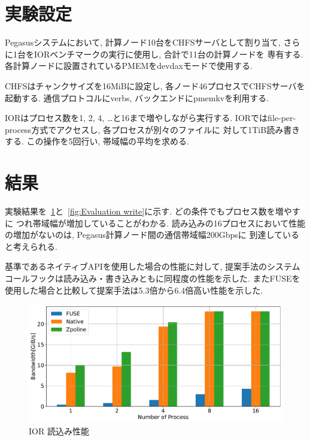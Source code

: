 \documentclass[a4paper,11pt]{jreport}
\begin{document}
\section{実験設定}
Pegasusシステムにおいて, 計算ノード10台をCHFSサーバとして割り当て, さらに1台をIORベンチマークの実行に使用し, 合計で11台の計算ノードを
専有する. 各計算ノードに設置されているPMEMをdevdaxモードで使用する. 

CHFSはチャンクサイズを16MiBに設定し, 各ノード46プロセスでCHFSサーバを起動する. 通信プロトコルにverbs, バックエンドにpmemkvを利用する. 

IORはプロセス数を1, 2, 4, …と16まで増やしながら実行する. IORではfile-per-process方式でアクセスし, 各プロセスが別々のファイルに
対して1TiB読み書きする. この操作を5回行い, 帯域幅の平均を求める. 
\section{結果}

実験結果を\figurename~\ref{fig:Evaluation read}と\figurename~\ref{fig:Evaluation write}に示す. どの条件でもプロセス数を増やすに
つれ帯域幅が増加していることがわかる. 読み込みの16プロセスにおいて性能の増加がないのは, Pegasus計算ノード間の通信帯域幅200Gbpsに
到達していると考えられる. 

基準であるネイティブAPIを使用した場合の性能に対して, 提案手法のシステムコールフックは読み込み・書き込みともに同程度の性能を示した. 
またFUSEを使用した場合と比較して提案手法は5.3倍から6.4倍高い性能を示した. 

\newpage

\begin{figure}[h]
	\begin{minipage}[b]{1\columnwidth}
		\centering
		\includegraphics[width=0.9\linewidth]{./figure/ior_benchmark_read.pdf}
		\caption{IOR 読込み性能}
		\label{fig:Evaluation read}
	\end{minipage}
\end{figure}
\end{document}
